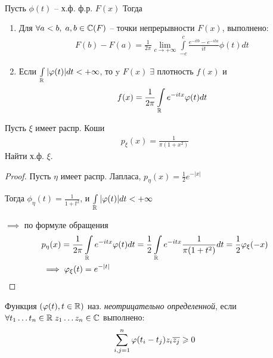 \begin{theorem}~

  Пусть $\phi(t)$ -- х.ф. ф.р. $F(x)$
  Тогда
  \begin{enumerate}
    \item
      Для $\forall a < b, \; a, b \in \mathbb{C}(F)$ -- точки непрерывности $F(x)$, выполнено:
      \begin{align*}
        F(b) - F(a) = \frac{1}{2 \pi} \lim_{c \to +\infty} 
        \int\limits_{-c}^{c} \frac{e^{- i t b} - e^{- i t a}}{it} \phi(t) dt
      \end{align*}

    \item
      Если $\int\limits_{\mathbb{R}} |\varphi(t)| dt < +\infty$, 
      то y $F(x) \; \exists$ плотность $f(x)$ и
      \begin{align*}
        f(x) = \frac{1}{2\pi} \int\limits_{\mathbb{R}} e^{-i t x} \varphi(t) dt
      \end{align*}
  \end{enumerate}

\end{theorem}

\begin{example}
  Пусть $\xi$ имеет распр. Коши
  \begin{align*}
    p_{\xi} (x) = \frac{1}{\pi (1 + x^2)}
  \end{align*}
  Найти х.ф. $\xi$.

  \begin{proof}
    Пусть $\eta$ имеет распр. Лапласа, $p_{\eta} (x) = \frac{1}{2} e^{-|x|}$

    Тогда $\phi_{\eta} (t) = \frac{1}{1 + t^2}$, и
    $\int\limits_{\mathbb{R}} |\varphi(t)| dt < +\infty$

    $\implies$ по формуле обращения 
    \begin{align*}
      &p_{\eta}(x) = \frac{1}{2 \pi} \int\limits_{\mathbb{R}} e^{- i t x} \varphi(t) dt 
      = \frac{1}{2} \int\limits_{\mathbb{R}} e^{- i t x} \frac{1}{\pi (1 + t^2)} dt
      = \frac{1}{2} \varphi_\xi (-x)\\
      &\implies  \varphi_{\xi} (t) = e^{-|t|}
    \end{align*}
  \end{proof}
\end{example}


\begin{definition}
  Функция $(\varphi(t), t \in \mathbb{R})$ наз. \emph{неотрицательно определенной},
  если $\forall t_1 \ldots t_n \in \mathbb{R} \; z_1 \ldots z_n \in \mathbb{C}$ выполнено:
  \begin{align*}
    \sum_{i, j = 1}^{n} \varphi(t_i - t_j) z_i \overline{z_j} \geqslant 0
  \end{align*}
\end{definition}

